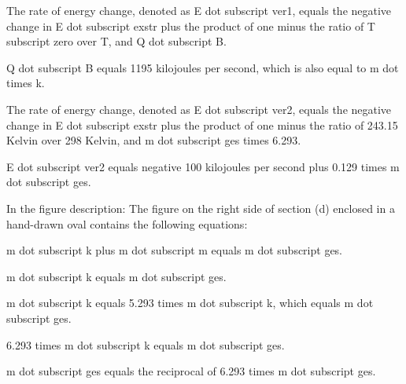The rate of energy change, denoted as E dot subscript ver1, equals the negative change in E dot subscript exstr plus the product of one minus the ratio of T subscript zero over T, and Q dot subscript B.

Q dot subscript B equals 1195 kilojoules per second, which is also equal to m dot times k.

The rate of energy change, denoted as E dot subscript ver2, equals the negative change in E dot subscript exstr plus the product of one minus the ratio of 243.15 Kelvin over 298 Kelvin, and m dot subscript ges times 6.293.

E dot subscript ver2 equals negative 100 kilojoules per second plus 0.129 times m dot subscript ges.

In the figure description:
The figure on the right side of section (d) enclosed in a hand-drawn oval contains the following equations:

m dot subscript k plus m dot subscript m equals m dot subscript ges.

m dot subscript k equals m dot subscript ges.

m dot subscript k equals 5.293 times m dot subscript k, which equals m dot subscript ges.

6.293 times m dot subscript k equals m dot subscript ges.

m dot subscript ges equals the reciprocal of 6.293 times m dot subscript ges.